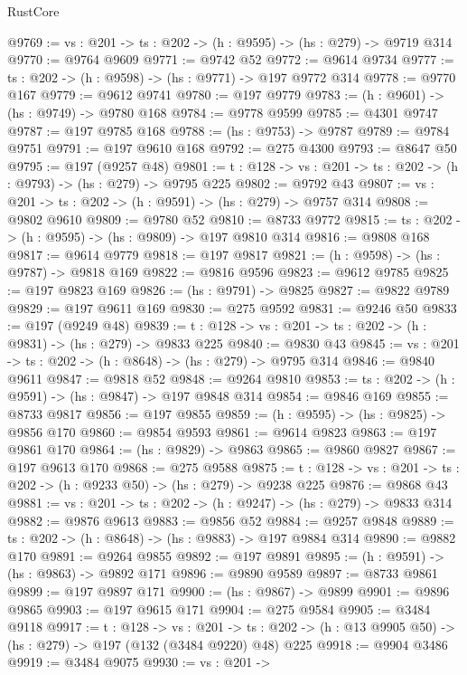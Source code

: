 \begin{lexlean}{RustCore}
\begin{coremodule}
@9769 := {vs : @201} -> {ts : @202} -> (h : @9595) -> (hs : @279) -> @9719 @314
@9770 := @9764 @9609
@9771 := @9742 @52
@9772 := @9614 @9734
@9777 := {ts : @202} -> (h : @9598) -> (hs : @9771) -> @197 @9772 @314
@9778 := @9770 @167
@9779 := @9612 @9741
@9780 := @197 @9779
@9783 := (h : @9601) -> (hs : @9749) -> @9780 @168
@9784 := @9778 @9599
@9785 := @4301 @9747
@9787 := @197 @9785 @168
@9788 := (hs : @9753) -> @9787
@9789 := @9784 @9751
@9791 := @197 @9610 @168
@9792 := @275 @4300
@9793 := @8647 @50
@9795 := @197 (@9257 @48)
@9801 := {t : @128} -> {vs : @201} -> {ts : @202} -> (h : @9793) -> (hs : @279) -> @9795 @225
@9802 := @9792 @43
@9807 := {vs : @201} -> {ts : @202} -> (h : @9591) -> (hs : @279) -> @9757 @314
@9808 := @9802 @9610
@9809 := @9780 @52
@9810 := @8733 @9772
@9815 := {ts : @202} -> (h : @9595) -> (hs : @9809) -> @197 @9810 @314
@9816 := @9808 @168
@9817 := @9614 @9779
@9818 := @197 @9817
@9821 := (h : @9598) -> (hs : @9787) -> @9818 @169
@9822 := @9816 @9596
@9823 := @9612 @9785
@9825 := @197 @9823 @169
@9826 := (hs : @9791) -> @9825
@9827 := @9822 @9789
@9829 := @197 @9611 @169
@9830 := @275 @9592
@9831 := @9246 @50
@9833 := @197 (@9249 @48)
@9839 := {t : @128} -> {vs : @201} -> {ts : @202} -> (h : @9831) -> (hs : @279) -> @9833 @225
@9840 := @9830 @43
@9845 := {vs : @201} -> {ts : @202} -> (h : @8648) -> (hs : @279) -> @9795 @314
@9846 := @9840 @9611
@9847 := @9818 @52
@9848 := @9264 @9810
@9853 := {ts : @202} -> (h : @9591) -> (hs : @9847) -> @197 @9848 @314
@9854 := @9846 @169
@9855 := @8733 @9817
@9856 := @197 @9855
@9859 := (h : @9595) -> (hs : @9825) -> @9856 @170
@9860 := @9854 @9593
@9861 := @9614 @9823
@9863 := @197 @9861 @170
@9864 := (hs : @9829) -> @9863
@9865 := @9860 @9827
@9867 := @197 @9613 @170
@9868 := @275 @9588
@9875 := {t : @128} -> {vs : @201} -> {ts : @202} -> (h : @9233 @50) -> (hs : @279) -> @9238 @225
@9876 := @9868 @43
@9881 := {vs : @201} -> {ts : @202} -> (h : @9247) -> (hs : @279) -> @9833 @314
@9882 := @9876 @9613
@9883 := @9856 @52
@9884 := @9257 @9848
@9889 := {ts : @202} -> (h : @8648) -> (hs : @9883) -> @197 @9884 @314
@9890 := @9882 @170
@9891 := @9264 @9855
@9892 := @197 @9891
@9895 := (h : @9591) -> (hs : @9863) -> @9892 @171
@9896 := @9890 @9589
@9897 := @8733 @9861
@9899 := @197 @9897 @171
@9900 := (hs : @9867) -> @9899
@9901 := @9896 @9865
@9903 := @197 @9615 @171
@9904 := @275 @9584
@9905 := @3484 @9118
@9917 := {t : @128} ->
  {vs : @201} ->
  {ts : @202} -> (h : @13 @9905 @50) -> (hs : @279) -> @197 (@132 (@3484 @9220) @48) @225
@9918 := @9904 @3486
@9919 := @3484 @9075
@9930 := {vs : @201} ->

\end{coremodule}
\end{lexlean}
